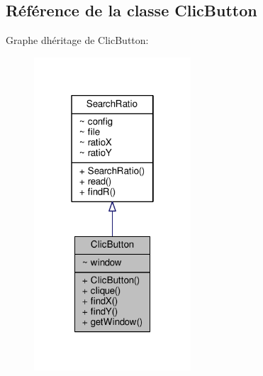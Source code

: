 \hypertarget{classClicButton}{}\subsection{Référence de la classe Clic\+Button}
\label{classClicButton}


Graphe d\textquotesingle{}héritage de Clic\+Button\+:\nopagebreak
\begin{figure}[H]
\begin{center}
\leavevmode
\includegraphics[width=166pt]{classClicButton__inherit__graph}
\end{center}
\end{figure}



